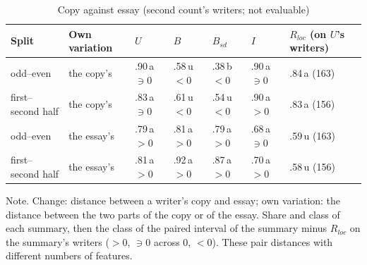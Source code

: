 \begin{table}[htbp]
\caption{Copy against essay (second count's writers; not evaluable)}
\label{tab:contrast}
\footnotesize
\begin{tabularx}{\linewidth}{@{}llXXXXX@{}}
\toprule
Split & Own variation & $U$ & $B$ & $B_{sd}$ & $I$ & $R_{loc}$ (on $U$'s writers) \\
\midrule
odd--even & the copy's & .90\,a $\ni 0$ & .58\,u $<0$ & .38\,b $<0$ & .90\,a $\ni 0$ & .84\,a (163) \\
first--second half & the copy's & .83\,a $\ni 0$ & .61\,u $<0$ & .54\,u $<0$ & .90\,a $>0$ & .83\,a (156) \\
odd--even & the essay's & .79\,a $>0$ & .81\,a $>0$ & .79\,a $>0$ & .68\,a $\ni 0$ & .59\,u (163) \\
first--second half & the essay's & .81\,a $>0$ & .92\,a $>0$ & .87\,a $>0$ & .70\,a $>0$ & .58\,u (156) \\
\bottomrule
\end{tabularx}
\par\smallskip\footnotesize Note. Change: distance between a writer's copy and essay; own variation: the distance between the two parts of the copy or of the essay. Share and class of each summary, then the class of the paired interval of the summary minus $R_{loc}$ on the summary's writers ($>0$, $\ni 0$ across 0, $<0$). These pair distances with different numbers of features.
\end{table}
